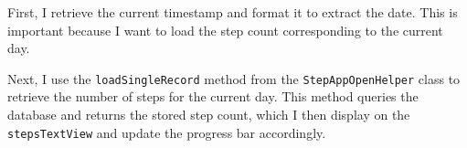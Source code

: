 First, I retrieve the current timestamp and format it to extract the date. This is important because I want to load the step count corresponding to the current day. 



Next, I use the \texttt{loadSingleRecord} method from the \texttt{StepAppOpenHelper} class to retrieve the number of steps for the current day. This method queries the database and returns the stored step count, which I then display on the \texttt{stepsTextView} and update the progress bar accordingly.

